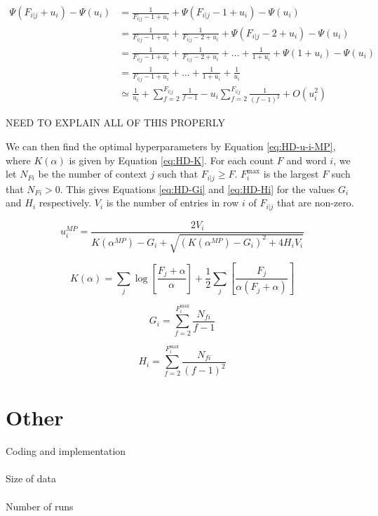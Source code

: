 \begin{align}
\Psi(F_{i|j}+u_{i})-\Psi(u_{i})&=\frac{1}{F_{i|j}-1+u_{i}}+\Psi(F_{i|j}-1+u_{i})-\Psi(u_{i}) \nonumber
\\
&=\frac{1}{F_{i|j}-1+u_{i}}+\frac{1}{F_{i|j}-2+u_{i}}+\Psi(F_{i|j}-2+u_{i})-\Psi(u_{i}) \nonumber
\\
&=\frac{1}{F_{i|j}-1+u_{i}}+\frac{1}{F_{i|j}-2+u_{i}}+...+\frac{1}{1+u_{i}}+\Psi(1+u_{i})-\Psi(u_{i}) \nonumber
\\
&=\frac{1}{F_{i|j}-1+u_{i}}+...+\frac{1}{1+u_{i}}+\frac{1}{u_{i}} \nonumber
\\
&\simeq \frac{1}{u_{i}}+\sum_{f=2}^{F_{i|j}}\frac{1}{f-1}-u_{i}\sum_{f=2}^{F_{i|j}}\frac{1}{(f-1)^{2}}+O(u_{i}^{2})
\label{eq:HD-digamma-F-u}
\end{align}

NEED TO EXPLAIN ALL OF THIS PROPERLY

We can then find the optimal hyperparameters by Equation \ref{eq:HD-u-i-MP}, where $K(\alpha)$ is given by Equation \ref{eq:HD-K}. For each count $F$ and word $i$, we let $N_{Fi}$ be the number of context $j$ such that $F_{i|j}\geq F$. $F_{i}^{\text{max}}$ is the largest $F$ such that $N_{Fi}>0$. This gives Equations \ref{eq:HD-Gi} and \ref{eq:HD-Hi} for the values $G_{i}$ and $H_{i}$ respectively. $V_{i}$ is the number of entries in row $i$ of $F_{i|j}$ that are non-zero.

\begin{equation}
u_{i}^{MP}=\frac{2V_{i}}{K(\alpha^{MP})-G_{i}+\sqrt{(K(\alpha^{MP})-G_{i})^{2}+4H_{i}V_{i}}}
\label{eq:HD-u-i-MP}
\end{equation}

\begin{equation}
K(\alpha)=\sum_{j}\log\left[\frac{F_{j}+\alpha}{\alpha}\right]+\frac{1}{2}\sum_{j}\left[\frac{F_{j}}{\alpha(F_{j}+\alpha)}\right]
\label{eq:HD-K}
\end{equation}

\begin{equation}
G_{i}=\sum_{f=2}^{F_{i}^{\text{max}}}\frac{N_{fi}}{f-1}
\label{eq:HD-Gi}
\end{equation}

\begin{equation}
H_{i}=\sum_{f=2}^{F_{i}^{\text{max}}}\frac{N_{fi}}{(f-1)^{2}}
\label{eq:HD-Hi}
\end{equation}


\section{Other}
Coding and implementation
\\ \\
Size of data
\\ \\
Number of runs